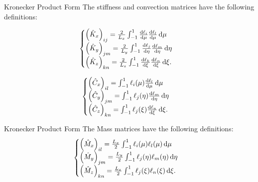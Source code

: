 \begin{frame}{Kronecker Product Form}
  The stiffness and convection matrices have the following definitions:

  \begin{equation}
    \label{eq:stiffness-matrics}
    \begin{cases}
      \left(\hat{K}_{x}\right)_{ij}=\frac{2}{L_x}\int_{-1}^{1}\odv{\ell_i}{\mu}\odv{\ell_l}{\mu}\odif{\mu}    \\
      \left(\hat{K}_{y}\right)_{jm}=\frac{2}{L_y}\int_{-1}^{1}\odv{\ell_j}{\eta}\odv{\ell_m}{\eta}\odif{\eta} \\
      \left(\hat{K}_{z}\right)_{kn}=\frac{2}{L_z}\int_{-1}^{1}\odv{\ell_k}{\xi}\odv{\ell_n}{\xi}\odif{\xi}.
    \end{cases}
  \end{equation}

  \begin{equation}
    \label{eq:convection-matrices}
    \begin{cases}
      \left(\hat{C}_x\right)_{il}=\int_{-1}^{1}\ell_i(\mu)\odv{\ell_l}{\mu}\odif{\mu}      \\
      \left({\hat{C}_y}\right)_{jm}=\int_{-1}^{1}\ell_j(\eta)\odv{\ell_m}{\eta}\odif{\eta} \\
      \left({\hat{C}_z}\right)_{kn}=\int_{-1}^{1}\ell_j(\xi)\odv{\ell_n}{\xi}\odif{\xi}.
    \end{cases}
  \end{equation}
\end{frame}

\begin{frame}{Kronecker Product Form}
  The Mass matrices have the following definitions:
  \begin{equation}
    \label{eq:mass-matrices}
    \begin{cases}
      \left(\hat{M}_x\right)_{il}=\frac{L_x}{2}\int_{-1}^{1}\ell_i(\mu)\ell_l(\mu)\odif{\mu}      \\
      \left({\hat{M}_y}\right)_{jm}=\frac{L_y}{2}\int_{-1}^{1}\ell_j(\eta)\ell_m(\eta)\odif{\eta} \\
      \left({\hat{M}_z}\right)_{kn}=\frac{L_z}{2}\int_{-1}^{1}\ell_j(\xi)\ell_n(\xi)\odif{\xi}.
    \end{cases}
  \end{equation}
\end{frame}
